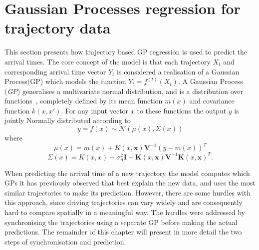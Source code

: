 \section{Gaussian Processes regression for trajectory data}
This section presents how trajectory based GP regression is used to predict the arrival times. The core concept of the model is that each trajectory $X_t$ and corresponding arrival time vector $Y_t$ is considered a realisation of a Gaussian Process(GP) which models the function $Y_t = f^{(t)}(X_t)$. A Gaussian Process (\textit{GP}) generalises a multivariate normal distribution, and is a distribution over functions~\cite{Rasmussen-Williams-2006}, completely defined by its mean function $m(x)$ and covariance function $k(x, x')$. For any input vector $x$ to these functions the output $y$ is jointly Normally distributed according to
\begin{equation}
  \label{eq:gp}
  y = f(x) \sim \mathcal{N}(\mu(x), \Sigma(x))
\end{equation}
where
\begin{equation}
  \label{eq:gp-mean-function}
  \mu(x) = m(x) + K(x, \textbf{x})\textbf{V}^{-1}{(y-m(x))}^{T}
\end{equation}
\begin{equation}
  \label{eq:gp-covariance-function}
  \Sigma(x) = K(x, x) + \sigma^{2}_n\textbf{I} - \textbf{K}(x, \textbf{x})\textbf{V}^{-1}{\textbf{K}(x, \textbf{x})}^{T}.
\end{equation}

When predicting the arrival time of a new trajectory the model computes which GPs it has previously observed that best explain the new data, and uses the most similar trajectories to make its prediction. However, there are some hurdles with this approach, since driving trajectories can vary widely and are consequently hard to compare spatially in a meaningful way. The hurdles were addressed by synchronising the trajectories using a separate GP before making the actual predictions. The remainder of this chapter will present in more detail the two steps of synchronisation and prediction.

